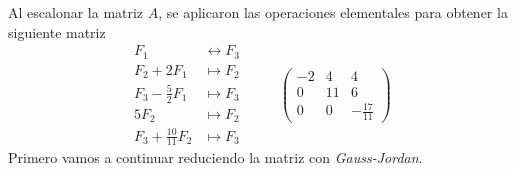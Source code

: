 \item Al escalonar la matriz \(A\), se aplicaron las operaciones elementales para obtener la siguiente matriz
    \[
        \begin{aligned}
            F_1 &\leftrightarrow F_3 \\
            F_2 + 2F_1 &\mapsto F_2 \\ 
            F_3 - \frac{5}{2}F_1 &\mapsto F_3 \\
            5F_2 &\mapsto F_2 \\ 
            F_3 + \frac{10}{11}F_2 &\mapsto F_3
        \end{aligned}
        \hspace{1cm}
        \begin{pmatrix}
            -2 & 4 & 4 \\ 
            0 & 11 & 6 \\ 
            0 & 0 & -\frac{17}{11}
        \end{pmatrix}
    \]
    Primero vamos a continuar reduciendo la matriz con \emph{Gauss-Jordan}.
